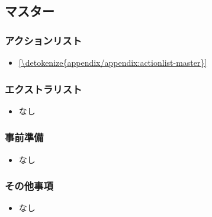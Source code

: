 \documentclass[letterpaper,10pt,dvipdfmx]{sphinxmanual}
\begin{document}
\sphinxstepscope


\subsection{マスター}
\label{\detokenize{format/master:format-master}}\label{\detokenize{format/master:id1}}\label{\detokenize{format/master::doc}}

\subsubsection{アクションリスト}
\label{\detokenize{format/master:id2}}\begin{itemize}
\item {} 
\sphinxAtStartPar
\hyperref[\detokenize{appendix/appendix:actionlist-master}]{\ref{\detokenize{appendix/appendix:actionlist-master}} }

\end{itemize}


\subsubsection{エクストラリスト}
\label{\detokenize{format/master:id3}}\begin{itemize}
\item {} 
\sphinxAtStartPar
なし

\end{itemize}


\subsubsection{事前準備}
\label{\detokenize{format/master:id4}}\begin{itemize}
\item {} 
\sphinxAtStartPar
なし

\end{itemize}


\subsubsection{その他事項}
\label{\detokenize{format/master:id5}}\begin{itemize}
\item {} 
\sphinxAtStartPar
なし

\end{itemize}

\sphinxstepscope
\end{document}
